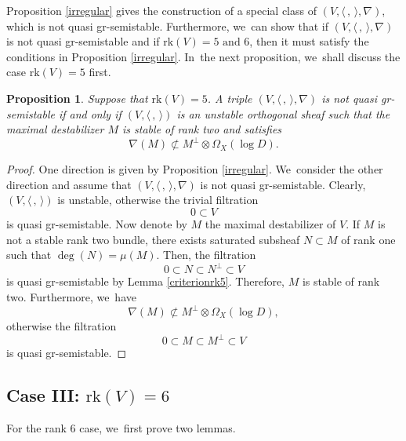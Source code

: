 \documentclass[JEP,XML,SOM,Unicode,published]{cedram}
\newcommand{\grsemistable}{gr\nobreakdash-semi\-stable\xspace}
\newcommand{\rk}{\mathrm{rk}}
\theoremstyle{plain}
\newtheorem{prop}[thm]{Proposition}
\theoremstyle{definition}
\begin{document}
Proposition \ref{irregular} gives the construction of a special class of $(V, \langle \,,\, \rangle, \nabla)$, which is not quasi \grsemistable. Furthermore, we~can show that if $(V, \langle \,,\, \rangle, \nabla)$ is not quasi \grsemistable and if $\rk(V)=5 \text{ and } 6$, then it must satisfy the conditions in Proposition \ref{irregular}. In~the next proposition, we~shall discuss the case $\rk(V)=5$ first.

\begin{prop}\label{classfication5}
Suppose that $\rk(V)=5$. A triple $(V,\langle \,, \, \rangle,\nabla)$ is not quasi \grsemistable if and only if $(V, \langle \,, \, \rangle)$ is an unstable orthogonal sheaf such that the maximal destabilizer $M$ is stable of rank two and satisfies
\[
\nabla(M)\not\subset M^\perp\otimes\Omega_X(\log D).
\]
\end{prop}

\begin{proof} 
One direction is given by Proposition \ref{irregular}. We~consider the other direction and assume that $(V,\langle \,, \, \rangle,\nabla)$ is not quasi \grsemistable. Clearly, $(V, \langle \,, \, \rangle)$ is unstable, otherwise the trivial filtration
\[
0\subset V
\]
is quasi \grsemistable. Now denote by $M$ the maximal destabilizer of $V$. If $M$ is not a stable rank two bundle, there exists saturated subsheaf $N \subset M$ of rank one such that $\deg(N)=\mu(M)$. Then, the filtration
\[
0\subset N\subset N^\perp\subset V
\]
is quasi \grsemistable by Lemma \ref{criterionrk5}. Therefore, $M$ is stable of rank two. Furthermore, we~have
\[
\nabla(M)\not\subset M^\perp\otimes\Omega_X(\log D),
\]
otherwise the filtration
\[
0\subset M \subset M^\perp\subset V
\]
is quasi \grsemistable.
\end{proof}

\subsection{Case III: ${\rk(V) = 6}$}
For the rank $6$ case, we~first prove two lemmas.
\end{document}
